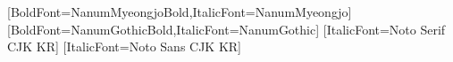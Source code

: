[BoldFont=NanumMyeongjoBold,ItalicFont=NanumMyeongjo]
[BoldFont=NanumGothicBold,ItalicFont=NanumGothic]
[ItalicFont=Noto Serif CJK KR]
[ItalicFont=Noto Sans CJK KR]
